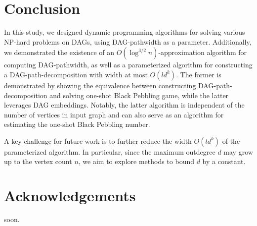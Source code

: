 \documentclass[runningheads]{llncs}
\theoremstyle{plain}
\theoremstyle{definition}
\begin{document}
\section{Conclusion}

In this study, we designed dynamic programming algorithms for solving various NP-hard problems on DAGs, using DAG-pathwidth as a parameter. Additionally, we demonstrated the existence of an $O(\log^{3/2} n)$-approximation algorithm for computing DAG-pathwidth, as well as a parameterized algorithm for constructing a DAG-path-decomposition with width at most $O(ld^k)$. The former is demonstrated by showing the equivalence between constructing DAG-path-decomposition and solving one-shot Black Pebbling game, while the latter leverages DAG embeddings. Notably, the latter algorithm is independent of the number of vertices in input graph and can also serve as an algorithm for estimating the one-shot Black Pebbling number.

A key challenge for future work is to further reduce the width $O(ld^k)$ of the parameterized algorithm. In particular, since the maximum outdegree $d$ may grow up to the vertex count $n$, we aim to explore methods to bound $d$ by a constant.
























\section*{Acknowledgements}

soon.
\end{document}
